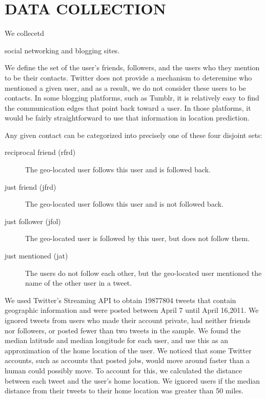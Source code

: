 \documentclass{sig-alternate}
\begin{document}
\section{DATA COLLECTION}
We collecetd 

social networking and blogging sites.

We define the set of the user's friends, followers, and the users who they mention to be their contacts.
Twitter does not provide a mechanism to deteremine who mentioned a given user, and as a result, we do not consider these users to be contacts.
In some blogging platforms, such as Tumblr, it is relatively easy to find the communication edges that point back toward a user.
In those platforms, it would be fairly straightforward to use that information in location prediction.

Any given contact can be categorized into precisely one of these four disjoint sets:
\begin{description}
\item[reciprocal friend (rfrd)] The geo-located user follows this user and is followed back.
\item[just friend (jfrd)] The geo-located user follows this user and is not followed back.
\item[just follower (jfol)]The geo-located user is followed by this user, but does not follow them.
\item[just mentioned (jat)] The users do not follow each other, but the geo-located user mentioned the name of the other user in a tweet.
\end{description}

We used Twitter's Streaming API to obtain 19877804 tweets that contain
geographic information and were posted between April 7 until April 16,2011.
We ignored tweets from users who made their account private, had neither
friends nor followers, or posted fewer than two tweets in the sample.
We found the median latitude and median longitude for each user, and use this
as an approximation of the home location of the user.
We noticed that some Twitter accounts, such as accounts that posted jobs, would
move around faster than a human could possibly move. To account for this, we
calculated the distance between each tweet and the user's home location. We
ignored users if the median distance from their tweets to their home location
was greater than 50 miles.
\end{document}
